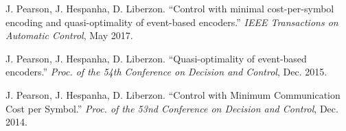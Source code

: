 \vspace{0.1cm}

J. Pearson, J. Hespanha, D. Liberzon. ``Control with minimal cost-per-symbol encoding and quasi-optimality of event-based encoders.'' {\it IEEE Transactions on Automatic Control}, May 2017. 

\vspace{0.1cm}

J. Pearson, J. Hespanha, D. Liberzon. ``Quasi-optimality of event-based encoders.'' {\it Proc. of the 54th Conference on Decision and Control}, Dec. 2015.

\vspace{0.1cm}

J. Pearson, J. Hespanha, D. Liberzon. ``Control with Minimum Communication Cost per Symbol.'' {\it Proc. of the 53nd Conference on Decision and Control}, Dec. 2014.
